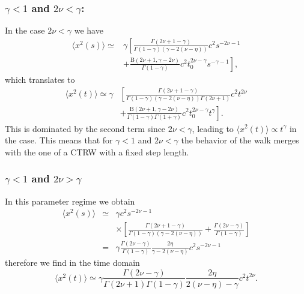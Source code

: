 \subsubsection{$\gamma<1$ and $2\nu < \gamma$: }
In the case  $2\nu < \gamma $ we have
\begin{equation}
\begin{split}
\langle x^2(s) \rangle  \simeq &  \gamma  \left[\frac{\Gamma(2\nu +1-\gamma)}{\Gamma(1-\gamma)(\gamma - 2(\nu-\eta))}c^2 s^{-2\nu -1} \right. \\
& \left. + \frac{\mathrm{B}(2\nu+1,\gamma-2\nu)}{\Gamma(1-\gamma)}c^2 t_0^{2\nu-\gamma} s^{-\gamma -1} \right] , 
\end{split}
\end{equation}
which translates to
\begin{equation}
\begin{split}
 \langle x^2(t) \rangle \simeq \gamma  & \left[\frac{\Gamma(2\nu +1-\gamma)}{\Gamma(1-\gamma)(\gamma-2(\nu-\eta))\Gamma(2\nu + 1)} c^2 t^{2\nu} \right. \\ 
 & \left.  + \frac{\mathrm{B}(2\nu+1,\gamma-2\nu)}{\Gamma(1-\gamma)\Gamma(1+\gamma)} c^2 t_0^{2\nu-\gamma} t^{\gamma} \right].
 \end{split}
\end{equation}
This is dominated by the second term since $2\nu < \gamma$, leading to  $\langle x^2(t) \rangle \propto t^\gamma$ in the case. 
This means that for $\gamma < 1$ and $2\nu < \gamma$ the behavior of the walk merges with the one of a CTRW
with a fixed step length.



\subsubsection{$\gamma<1$ and  $2\nu > \gamma$ }
In this parameter regime we obtain
\begin{eqnarray}
 \langle x^2(s) \rangle &\simeq & \gamma c^2 s^{-2\nu-1} \nonumber \\
 && \times \left[\frac{\Gamma(2\nu+1-\gamma)}{\Gamma(1-\gamma)(\gamma - 2(\nu-\eta))} +  \frac{\Gamma(2\nu-\gamma)}{\Gamma(1-\gamma)} \right]  \nonumber \\
 &= & \gamma  \frac{\Gamma(2\nu -\gamma)}{\Gamma(1-\gamma)} \frac{2\eta }{\gamma - 2(\nu-\eta)}c^2  s^{-2\nu-1}
\end{eqnarray}
therefore we find in the time domain
\begin{equation}
 \langle x^2(t) \rangle \simeq \gamma \frac{\Gamma(2\nu -\gamma)} {\Gamma(2\nu+1) \Gamma(1-\gamma)} \frac{2\eta}{2(\nu-\eta)-\gamma}  c^2  t^{2\nu} .
\end{equation}

